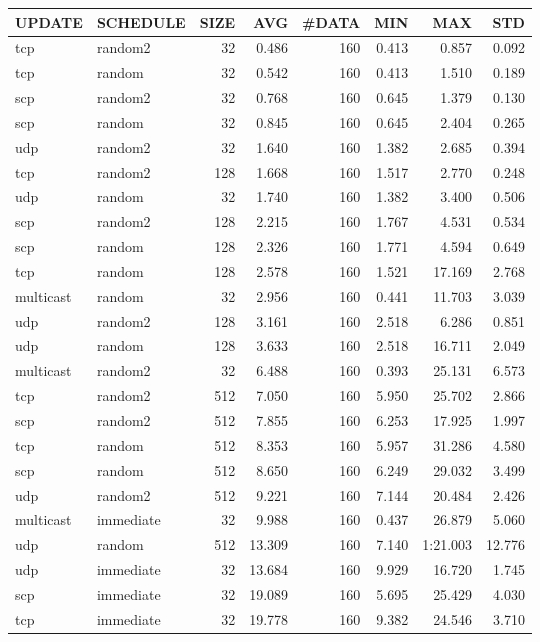\begin{tabular}{|l|l|r|r|r|r|r|r|}
\hline
UPDATE & SCHEDULE & SIZE & AVG & \#DATA & MIN & MAX & STD\\
\hline
tcp & random2 & 32 & 0.486 & 160 & 0.413 & 0.857 & 0.092\\
tcp & random & 32 & 0.542 & 160 & 0.413 & 1.510 & 0.189\\
scp & random2 & 32 & 0.768 & 160 & 0.645 & 1.379 & 0.130\\
scp & random & 32 & 0.845 & 160 & 0.645 & 2.404 & 0.265\\
udp & random2 & 32 & 1.640 & 160 & 1.382 & 2.685 & 0.394\\
tcp & random2 & 128 & 1.668 & 160 & 1.517 & 2.770 & 0.248\\
udp & random & 32 & 1.740 & 160 & 1.382 & 3.400 & 0.506\\
scp & random2 & 128 & 2.215 & 160 & 1.767 & 4.531 & 0.534\\
scp & random & 128 & 2.326 & 160 & 1.771 & 4.594 & 0.649\\
tcp & random & 128 & 2.578 & 160 & 1.521 & 17.169 & 2.768\\
multicast & random & 32 & 2.956 & 160 & 0.441 & 11.703 & 3.039\\
udp & random2 & 128 & 3.161 & 160 & 2.518 & 6.286 & 0.851\\
udp & random & 128 & 3.633 & 160 & 2.518 & 16.711 & 2.049\\
multicast & random2 & 32 & 6.488 & 160 & 0.393 & 25.131 & 6.573\\
tcp & random2 & 512 & 7.050 & 160 & 5.950 & 25.702 & 2.866\\
scp & random2 & 512 & 7.855 & 160 & 6.253 & 17.925 & 1.997\\
tcp & random & 512 & 8.353 & 160 & 5.957 & 31.286 & 4.580\\
scp & random & 512 & 8.650 & 160 & 6.249 & 29.032 & 3.499\\
udp & random2 & 512 & 9.221 & 160 & 7.144 & 20.484 & 2.426\\
multicast & immediate & 32 & 9.988 & 160 & 0.437 & 26.879 & 5.060\\
udp & random & 512 & 13.309 & 160 & 7.140 & 1:21.003 & 12.776\\
udp & immediate & 32 & 13.684 & 160 & 9.929 & 16.720 & 1.745\\
scp & immediate & 32 & 19.089 & 160 & 5.695 & 25.429 & 4.030\\
tcp & immediate & 32 & 19.778 & 160 & 9.382 & 24.546 & 3.710\\

\end{tabular}
